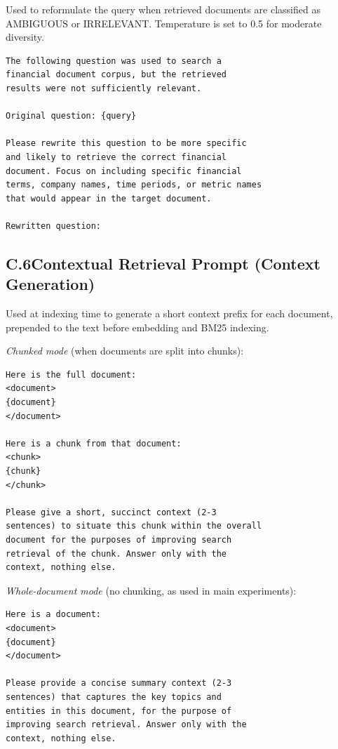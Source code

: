 \documentclass[11pt]{article}
\begin{document}
Used to reformulate the query when retrieved documents are classified as AMBIGUOUS or IRRELEVANT. Temperature is set to 0.5 for moderate diversity.

\begin{small}
\begin{verbatim}
The following question was used to search a
financial document corpus, but the retrieved
results were not sufficiently relevant.

Original question: {query}

Please rewrite this question to be more specific
and likely to retrieve the correct financial
document. Focus on including specific financial
terms, company names, time periods, or metric names
that would appear in the target document.

Rewritten question:
\end{verbatim}
\end{small}

\subsection*{C.6\quad Contextual Retrieval Prompt (Context Generation)}

Used at indexing time to generate a short context prefix for each document, prepended to the text before embedding and BM25 indexing.

\noindent\textit{Chunked mode} (when documents are split into chunks):

\begin{small}
\begin{verbatim}
Here is the full document:
<document>
{document}
</document>

Here is a chunk from that document:
<chunk>
{chunk}
</chunk>

Please give a short, succinct context (2-3
sentences) to situate this chunk within the overall
document for the purposes of improving search
retrieval of the chunk. Answer only with the
context, nothing else.
\end{verbatim}
\end{small}

\noindent\textit{Whole-document mode} (no chunking, as used in main experiments):

\begin{small}
\begin{verbatim}
Here is a document:
<document>
{document}
</document>

Please provide a concise summary context (2-3
sentences) that captures the key topics and
entities in this document, for the purpose of
improving search retrieval. Answer only with the
context, nothing else.
\end{verbatim}
\end{small}
\end{document}
